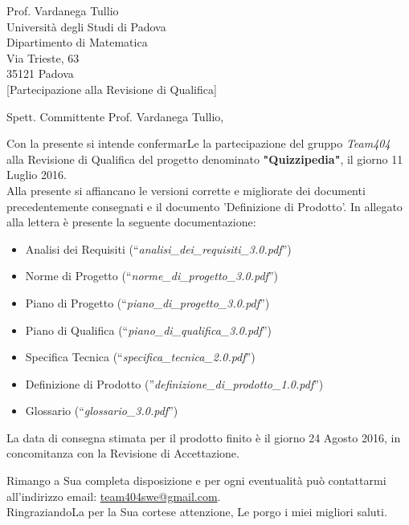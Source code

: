 \documentclass[boldsubject,shortindent,a4paper,11pt]{letteracdp}
\date{1 Luglio 2016}
\begin{document}
\begin{letter}{	Prof. Vardanega Tullio \\
				Universit\`a degli Studi di Padova \\
				Dipartimento di Matematica \\
				Via Trieste, 63 \\
				35121 Padova\\
				}
[Partecipazione alla Revisione di Qualifica]
\opening{Spett. Committente Prof. Vardanega Tullio,}
\noindent
Con la presente si intende confermarLe la partecipazione del gruppo \emph{Team404} alla Revisione di Qualifica del progetto denominato \textbf{"Quizzipedia"}, il giorno 11 Luglio 2016.
\\
\noindent
Alla presente si affiancano le versioni corrette e migliorate dei documenti precedentemente consegnati e il documento 'Definizione di Prodotto'.
\newline
\noindent
In allegato alla lettera è presente la seguente documentazione:
\begin{itemize}
	\item Analisi dei Requisiti (``\textit{analisi\_dei\_requisiti\_3.0.pdf}'')
	\item Norme di Progetto (``\textit{norme\_di\_progetto\_3.0.pdf}'')
	\item Piano di Progetto (``\textit{piano\_di\_progetto\_3.0.pdf}'')
	\item Piano di Qualifica (``\textit{piano\_di\_qualifica\_3.0.pdf}'')
	\item Specifica Tecnica (``\textit{specifica\_tecnica\_2.0.pdf}'')
	\item Definizione di Prodotto (''\textit{definizione\_di\_prodotto\_1.0.pdf}'')
	\item Glossario (``\textit{glossario\_3.0.pdf}'')
\end{itemize}

\noindent

La data di consegna stimata per il prodotto finito è il giorno 24 Agosto 2016, in concomitanza con la Revisione di Accettazione.

\closing{Rimango a Sua completa disposizione e per ogni eventualit\`a pu\`o contattarmi all'indirizzo email: \url{team404swe@gmail.com}.\\RingraziandoLa per la Sua cortese attenzione, Le porgo i miei migliori saluti.}
\end{letter}
\end{document}
